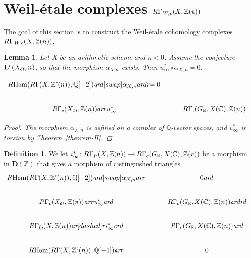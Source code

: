 \documentclass[leqno,12pt]{article}
\theoremstyle{plain}
\newtheorem{lemma}[theorem]{\indent\sc Lemma}
\theoremstyle{definition}
\newtheorem{definition}[theorem]{\indent\sc Definition}
\DeclareMathOperator{\Hom}{Hom}
\newcommand{\CC}{\mathbb{C}}
\newcommand{\QQ}{\mathbb{Q}}
\newcommand{\RR}{\mathbb{R}}
\newcommand{\ZZ}{\mathbb{Z}}
\newcommand{\Wc}{\text{\it W,c}}
\newcommand{\ar}{\text{\it ar}}
\newcommand{\et}{\text{\it \'{e}t}}
\newcommand{\fg}{\text{\it fg}}
\newcommand{\RHom}{R\!\Hom}
\newcommand{\DZ}{{\mathbf{D} (\ZZ)}}
\begin{document}

\section{Weil-\'{e}tale complexes $R\Gamma_\Wc (X, \ZZ(n))$}
\label{sec:RGamma-Wc}

The goal of this section is to construct the Weil-\'{e}tale cohomology complexes
$R\Gamma_\Wc (X, \ZZ(n))$.

\begin{lemma}
  Let $X$ be an arithmetic scheme and $n < 0$. Assume the conjecture
  $\mathbf{L}^c (X_\et, n)$, so that the morphism $\alpha_{X,n}$ exists.
  Then $u_\infty^* \circ \alpha_{X,n} = 0$.

  \[ \begin{tikzcd}
    \RHom (R\Gamma (X, \ZZ^c (n)), \QQ [-2]) \ar{d}[swap]{\alpha_{X,n}}\ar{dr}{= 0} \\
      R\Gamma_c (X_\et, \ZZ (n)) \ar{r}{u_\infty^*} & R\Gamma_c (G_\RR, X (\CC), \ZZ (n))
    \end{tikzcd} \]

  \begin{proof}
    The morphism $\alpha_{X,n}$ is defined on a complex of $\QQ$-vector spaces,
    and $u_\infty^*$ is torsion by Theorem~\ref{theorem-II}.
  \end{proof}
\end{lemma}

\begin{definition}
  \label{dfn:i-infty}
  We let
  $i_\infty^*\colon R\Gamma_\fg (X, \ZZ (n)) \to R\Gamma_c (G_\RR, X (\CC), \ZZ (n))$
  be a morphism in $\DZ$ that gives a morphism of distinguished triangles
  \begin{equation}
    \label{eqn:triangle-defining-i-infty}
    \begin{tikzcd}
      \RHom (R\Gamma (X, \ZZ^c (n)), \QQ [-2]) \ar{d}[swap]{\alpha_{X,n}}\ar{r} & 0\ar{d} \\
      R\Gamma_c (X_\et, \ZZ (n)) \ar{r}{u_\infty^*}\ar{d} &  R\Gamma_c (G_\RR, X (\CC), \ZZ (n)) \ar{d}{id} \\
      R\Gamma_\fg (X, \ZZ (n)) \ar[dashed]{r}{i_\infty^*}\ar{d} & R\Gamma_c (G_\RR, X (\CC), \ZZ (n)) \ar{d} \\
      \RHom (R\Gamma (X, \ZZ^c (n)), \QQ [-1])\ar{r} & 0 \\
    \end{tikzcd}
  \end{equation}
\end{definition}
\end{document}
